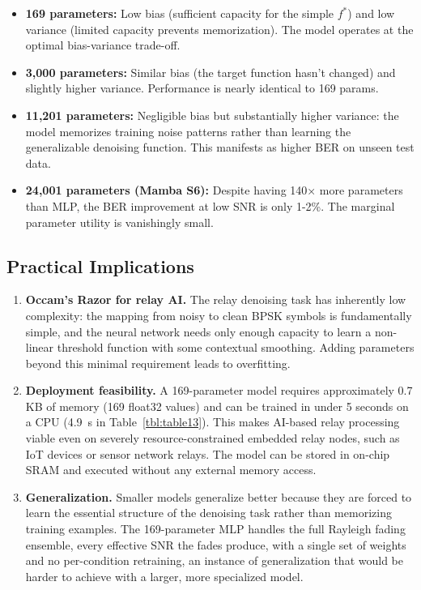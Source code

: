 \begin{itemize}
\tightlist
\item
  \textbf{169 parameters:} Low bias (sufficient capacity for the simple \(f^*\)) and low variance (limited capacity prevents memorization). The model operates at the optimal bias-variance trade-off.
\item
  \textbf{3,000 parameters:} Similar bias (the target function hasn't changed) and slightly higher variance. Performance is nearly identical to 169 params.
\item
  \textbf{11,201 parameters:} Negligible bias but substantially higher variance: the model memorizes training noise patterns rather than learning the generalizable denoising function. This manifests as higher BER on unseen test data.
\item
  \textbf{24,001 parameters (Mamba S6):} Despite having 140× more parameters than MLP, the BER improvement at low SNR is only 1-2\%. The marginal parameter utility is vanishingly small.
\end{itemize}

\subsection{Practical Implications}\label{sec:practical-implications}

\begin{enumerate}
\def\labelenumi{\arabic{enumi}.}
\item
  \textbf{Occam's Razor for relay AI.} The relay denoising task has inherently low complexity: the mapping from noisy to clean BPSK symbols is fundamentally simple, and the neural network needs only enough capacity to learn a non-linear threshold function with some contextual smoothing. Adding parameters beyond this minimal requirement leads to overfitting.
\item
  \textbf{Deployment feasibility.} A 169-parameter model requires approximately 0.7 KB of memory (169 float32 values) and can be trained in under 5 seconds on a CPU (4.9~s in Table~\ref{tbl:table13}). This makes AI-based relay processing viable even on severely resource-constrained embedded relay nodes, such as IoT devices or sensor network relays. The model can be stored in on-chip SRAM and executed without any external memory access.
\item
  \textbf{Generalization.} Smaller models generalize better because they are forced to learn the essential structure of the denoising task rather than memorizing training examples. The 169-parameter MLP handles the full Rayleigh fading ensemble, every effective SNR the fades produce, with a single set of weights and no per-condition retraining, an instance of generalization that would be harder to achieve with a larger, more specialized model.
\end{enumerate}


